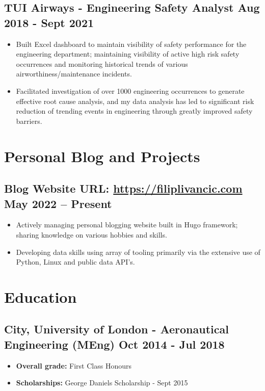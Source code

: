 \documentclass[a4paper,9pt]{article}
\begin{document}
\subsection*{\textbf{TUI Airways - Engineering Safety Analyst} \hfill  Aug 2018 - Sept 2021}
\begin{itemize}[noitemsep]
	\item Built Excel dashboard to maintain visibility of safety performance for the engineering department; maintaining visibility of active high risk safety occurrences and monitoring historical trends of various airworthiness/maintenance incidents.
	\item Facilitated investigation of over 1000 engineering occurrences to generate effective root cause analysis, and my data analysis has led to significant risk reduction of trending events in engineering through greatly improved safety barriers.
\end{itemize}

\section*{Personal Blog and Projects}

\subsection*{\textbf{Blog Website URL}: \url{https://filiplivancic.com} \hfill  May 2022 – Present}
\begin{itemize}[noitemsep]
	\item  Actively managing personal blogging website built in Hugo framework; sharing knowledge on various hobbies and skills.
    \item  Developing data skills using array of tooling primarily via the extensive use of Python, Linux and public data API's.
\end{itemize}

\section*{Education}
\subsection*{\textbf {City, University of London - Aeronautical Engineering (MEng)}  \hfill Oct 2014 - Jul 2018}\FloatBarrier
\begin{itemize}[noitemsep]
	\item \textbf{Overall grade:} First Class Honours %
	\item \textbf{Scholarships:} George Daniels Scholarship - Sept 2015
\end{itemize}
\end{document}
